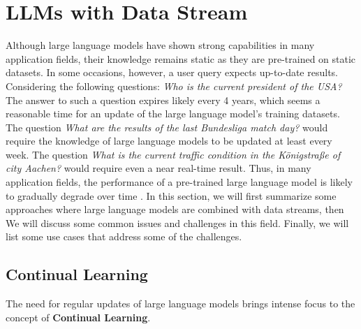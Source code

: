 \documentclass[runningheads]{llncs}
\begin{document}
\section{LLMs with Data Stream}
Although large language models have shown strong capabilities in many application fields, their knowledge remains static as they are pre-trained on static datasets. In some occasions, however, a user query
expects up-to-date results. Considering the following questions: \textit{Who is the current president of the USA?} The answer to such a question expires likely every 4 years, which seems a reasonable time
for an update of the large language model's training datasets. The question \textit{What are the results of the last Bundesliga match day?} would require the knowledge of large language models to be updated
at least every week. The question \textit{What is the current traffic condition in the Königstraße of city Aachen?} would require even a near real-time result. Thus, in many application fields, the performance of a 
pre-trained large language model is likely to gradually degrade over time \cite{Shi24}. In this section, we will first summarize some approaches where large language models are combined with data streams, then We
will discuss some common issues and challenges in this field. Finally, we will list some use cases that address some of the challenges.

\subsection{Continual Learning}
The need for regular updates of large language models brings intense focus to the concept of \textbf{Continual Learning}.  
\end{document}
